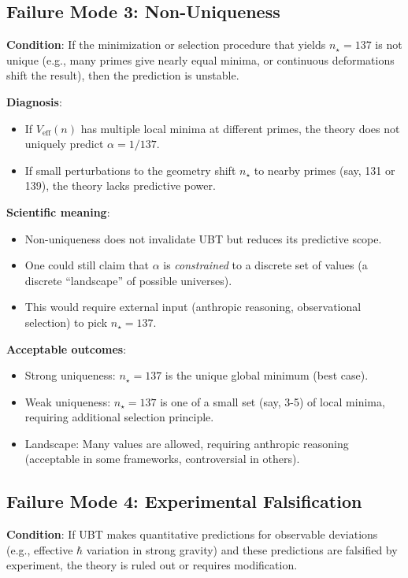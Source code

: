 \documentclass[12pt]{article}
\begin{document}
\subsection{Failure Mode 3: Non-Uniqueness}

\textbf{Condition}: If the minimization or selection procedure that yields $n_\star = 137$ is not unique (e.g., many primes give nearly equal minima, or continuous deformations shift the result), then the prediction is unstable.

\textbf{Diagnosis}:
\begin{itemize}
\item If $V_{\text{eff}}(n)$ has multiple local minima at different primes, the theory does not uniquely predict $\alpha = 1/137$.
\item If small perturbations to the geometry shift $n_\star$ to nearby primes (say, 131 or 139), the theory lacks predictive power.
\end{itemize}

\textbf{Scientific meaning}:
\begin{itemize}
\item Non-uniqueness does not invalidate UBT but reduces its predictive scope.
\item One could still claim that $\alpha$ is \emph{constrained} to a discrete set of values (a discrete ``landscape'' of possible universes).
\item This would require external input (anthropic reasoning, observational selection) to pick $n_\star = 137$.
\end{itemize}

\textbf{Acceptable outcomes}:
\begin{itemize}
\item Strong uniqueness: $n_\star = 137$ is the unique global minimum (best case).
\item Weak uniqueness: $n_\star = 137$ is one of a small set (say, 3-5) of local minima, requiring additional selection principle.
\item Landscape: Many values are allowed, requiring anthropic reasoning (acceptable in some frameworks, controversial in others).
\end{itemize}

\subsection{Failure Mode 4: Experimental Falsification}

\textbf{Condition}: If UBT makes quantitative predictions for observable deviations (e.g., effective $\hbar$ variation in strong gravity) and these predictions are falsified by experiment, the theory is ruled out or requires modification.
\end{document}
